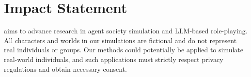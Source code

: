 \section*{Impact Statement}

\method aims to advance research in agent society simulation and LLM-based role-playing.
All characters and worlds in our simulations are fictional and do not represent real individuals or groups.
Our methods could potentially be applied to simulate real-world individuals, and such applications must strictly respect privacy regulations and obtain necessary consent.
